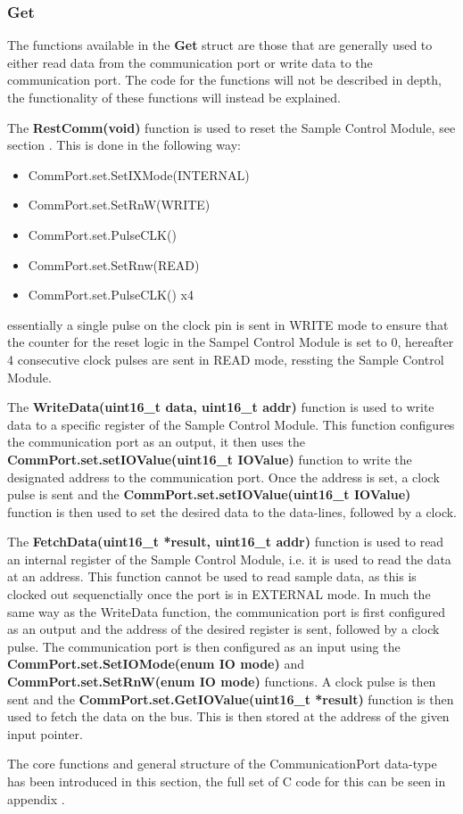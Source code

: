 \subsubsection*{Get}
The functions available in the \textbf{Get} struct are those that are generally used to either read data from the communication port or write data to the communication port. The code for the functions will not be described in depth, the functionality of these functions will instead be explained. 

The \textbf{RestComm(void)} function is used to reset the Sample Control Module, see section . This is done in the following way:
\begin{itemize}
    \item CommPort.set.SetIXMode(INTERNAL)
    \item CommPort.set.SetRnW(WRITE)
    \item CommPort.set.PulseCLK()
    \item CommPort.set.SetRnw(READ)
    \item CommPort.set.PulseCLK() x4
\end{itemize}

essentially a single pulse on the clock pin is sent in WRITE mode to ensure that the counter for the reset logic in the Sampel Control Module is set to 0, hereafter 4 consecutive clock pulses are sent in READ mode, ressting the Sample Control Module.

The \textbf{WriteData(uint16\_t data, uint16\_t addr)} function is used to write data to a specific register of the Sample Control Module. This function configures the communication port as an output, it then uses the \textbf{CommPort.set.setIOValue(uint16\_t IOValue)} function to write the designated address to the communication port. Once the address is set, a clock pulse is sent and the \textbf{CommPort.set.setIOValue(uint16\_t IOValue)} function is then used to set the desired data to the data-lines, followed by a clock. 

The \textbf{FetchData(uint16\_t *result, uint16\_t addr)} function is used to read an internal register of the Sample Control Module, i.e. it is used to read the data at an address. This function cannot be used to read sample data, as this is clocked out sequenctially once the port is in EXTERNAL mode. In much the same way as the WriteData function, the communication port is first configured as an output and the address of the desired register is sent, followed by a clock pulse. The communication port is then configured as an input using the \textbf{CommPort.set.SetIOMode(enum IO mode)} and \textbf{CommPort.set.SetRnW(enum IO mode)} functions. A clock pulse is then sent and the \textbf{CommPort.set.GetIOValue(uint16\_t *result)} function is then used to fetch the data on the bus. This is then stored at the address of the given input pointer. 

The core functions and general structure of the CommunicationPort data-type has been introduced in this section, the full set of C code for this can be seen in appendix .

